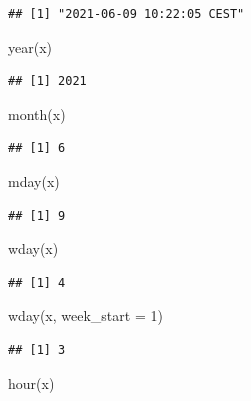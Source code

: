 \documentclass[
]{book}
\newenvironment{Shaded}{\begin{snugshade}}{\end{snugshade}}
\newcommand{\AttributeTok}[1]{\textcolor[rgb]{0.77,0.63,0.00}{#1}}
\newcommand{\DecValTok}[1]{\textcolor[rgb]{0.00,0.00,0.81}{#1}}
\newcommand{\FunctionTok}[1]{\textcolor[rgb]{0.00,0.00,0.00}{#1}}
\newcommand{\NormalTok}[1]{#1}
\begin{document}
\begin{verbatim}
## [1] "2021-06-09 10:22:05 CEST"
\end{verbatim}

\begin{Shaded}
\begin{Highlighting}[]
\FunctionTok{year}\NormalTok{(x)}
\end{Highlighting}
\end{Shaded}

\begin{verbatim}
## [1] 2021
\end{verbatim}

\begin{Shaded}
\begin{Highlighting}[]
\FunctionTok{month}\NormalTok{(x)}
\end{Highlighting}
\end{Shaded}

\begin{verbatim}
## [1] 6
\end{verbatim}

\begin{Shaded}
\begin{Highlighting}[]
\FunctionTok{mday}\NormalTok{(x)}
\end{Highlighting}
\end{Shaded}

\begin{verbatim}
## [1] 9
\end{verbatim}

\begin{Shaded}
\begin{Highlighting}[]
\FunctionTok{wday}\NormalTok{(x)}
\end{Highlighting}
\end{Shaded}

\begin{verbatim}
## [1] 4
\end{verbatim}

\begin{Shaded}
\begin{Highlighting}[]
\FunctionTok{wday}\NormalTok{(x, }\AttributeTok{week\_start =} \DecValTok{1}\NormalTok{)}
\end{Highlighting}
\end{Shaded}

\begin{verbatim}
## [1] 3
\end{verbatim}

\begin{Shaded}
\begin{Highlighting}[]
\FunctionTok{hour}\NormalTok{(x)}
\end{Highlighting}
\end{Shaded}
\end{document}

